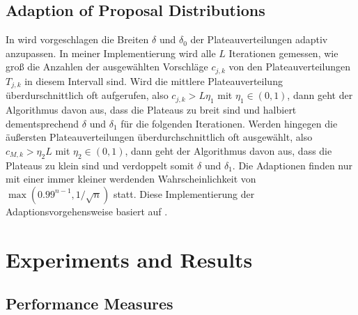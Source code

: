 \documentclass{scrartcl}
\begin{document}
    \subsection{Adaption of Proposal Distributions}
    In \cite{lau2019} wird vorgeschlagen die Breiten $\delta$ und $\delta_0$ der Plateauverteilungen adaptiv anzupassen.
    In meiner Implementierung wird alle $L$ Iterationen gemessen, wie groß die Anzahlen der ausgewählten Vorschläge $c_{j,k}$ von den Plateauverteilungen $T_{j,k}$ in diesem Intervall sind.
    Wird die mittlere Plateauverteilung überdurschnittlich oft aufgerufen, also $c_{j,k}>L\eta_1$ mit $\eta_1\in(0,1)$, dann
    geht der Algorithmus davon aus, dass die Plateaus zu breit sind und halbiert dementsprechend $\delta$ und $\delta_1$ für
    die folgenden Iterationen. Werden hingegen die äußersten Plateauverteilungen überdurchschnittlich oft ausgewählt, also
    $c_{M,k}>\eta_2L$ mit $\eta_2\in(0,1)$, dann geht der Algorithmus davon aus, dass die Plateaus zu klein sind und verdoppelt
    somit $\delta$ und $\delta_1$. Die Adaptionen finden nur mit einer immer kleiner werdenden Wahrscheinlichkeit von $\max(0.99^{n-1},1/\sqrt{n})$ statt. Diese Implementierung der Adaptionsvorgehensweise basiert auf \cite[Algorithm 2]{lau2019}.

    \section{Experiments and Results}

    \subsection{Performance Measures}
\end{document}
